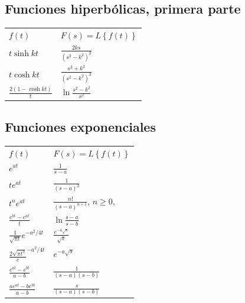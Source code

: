 \subsection{Funciones hiperb\'{o}licas, primera parte}

\begin{center}
\begin{tabular}{ll}
$f\left( t\right)$ & $F\left( s\right) =L\left\{f(t)\right\}$ \\ 
$t\sinh kt$ & $\frac{2ks}{\left( s^{2}-k^{2}\right) ^{2}} $ \\ 
$t\cosh kt$ & $\frac{s^{2}+k^{2}}{\left( s^{2}-k^{2}\right) ^{2}} $\\ 
$\frac{2\left( 1-\cosh kt\right) }{t}$ & $\ln \frac{s^{2}-k^{2}}{s^{2}}$ \\ 
\end{tabular}
\end{center}

\subsection{Funciones exponenciales}

\begin{center}
\begin{tabular}{ll}
$f\left( t\right)$ & $F\left( s\right) =L\left\{f(t)\right\}$ \\ 
$e^{at}$                        & $\frac{1}{s-a} $                                              \\ 
$te^{at}$                       & $\frac{1}{\left( s-a\right) ^{2}} $                           \\ 
$t^ne^{at}$                     & $\frac{n!}{\left( s-a\right) ^{n+1}} $, $n\geq 0,$            \\ 
$\frac{e^{bt}-e^{at}}{t} $      & $\ln \frac{s-a}{s-b}$                                         \\
$\frac{1}{\sqrt{\pi t}}e^{-a^{2}/4t}$ & $\frac{e^{-a\sqrt{s}}}{\sqrt{s}}$                       \\ 
$\frac{2\sqrt{\pi t^{3}}}e^{-a^{2}/4t} $ & $e^{-a\sqrt{s}} $                                    \\ 
$\frac{e^{at}-e^{bt}}{a-b}$ & $\frac{1}{\left( s-a\right) \left(s-b\right) } $                  \\ 
$\frac{ae^{at}-be^{bt}}{a-b}$ & $\frac{s}{\left( s-a\right) \left(s-b\right) }$
\end{tabular}

\end{center}


